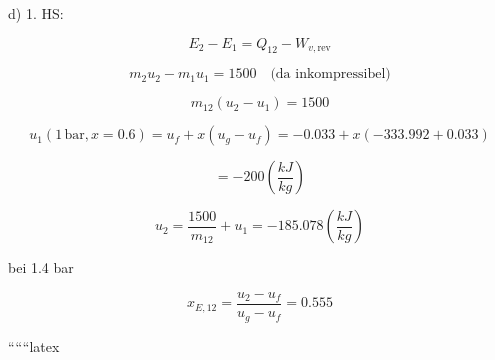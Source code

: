 d) 1. HS:

\begin{equation}
E_2 - E_1 = Q_{12} - W_{v, \text{rev}}
\end{equation}

\begin{equation}
m_2u_2 - m_1u_1 = 1500 \quad \text{(da inkompressibel)}
\end{equation}

\begin{equation}
m_{12}(u_2 - u_1) = 1500
\end{equation}

\begin{equation}
u_1(1 \, \text{bar}, x = 0.6) = u_f + x(u_g - u_f) = -0.033 + x(-333.992 + 0.033)
\end{equation}

\begin{equation}
= -200 \left(\frac{kJ}{kg}\right)
\end{equation}

\begin{equation}
u_2 = \frac{1500}{m_{12}} + u_1 = -185.078 \left(\frac{kJ}{kg}\right)
\end{equation}

bei 1.4 bar

\begin{equation}
x_{E,12} = \frac{u_2 - u_f}{u_g - u_f} = 0.555
\end{equation}

``````latex